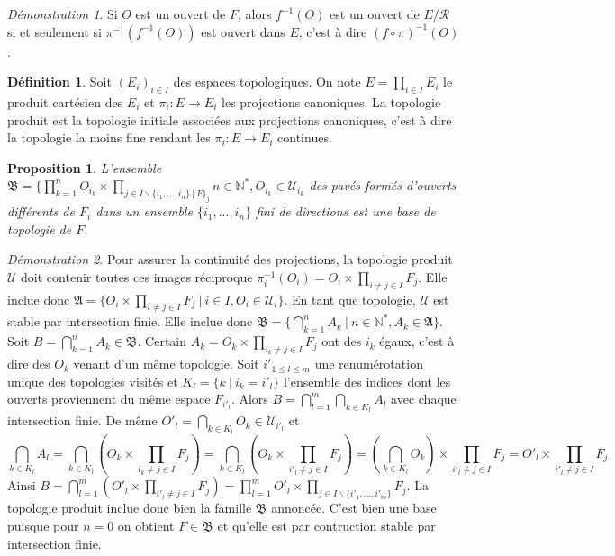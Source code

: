 \documentclass[a4paper, 11pt, french]{book}
\theoremstyle{plain} %
\newtheorem{proposition}{Proposition}
\theoremstyle{definition} %
\newtheorem{definition}{Définition}
\theoremstyle{remark} %
\newtheorem*{demonstration}{Démonstration}
\renewcommand{\setminus}{\backslash}
\newcommand{\1}{\mathds{1}}
\newcommand{\inv}[1]{#1^{-1}}
\newcommand{\N}{\mathbb{N}}
\renewcommand{\frak}[1]{\mathfrak{#1}}
\newcommand{\scr}[1]{\mathscr{#1}}
\newcommand\ens[2]{\{#1 \ |\ #2\}}
\begin{document}
\begin{demonstration}
	Si $O$ est un ouvert de $F$, alors $\inv{f}(O)$ est un ouvert de $E/\mathcal{R}$ si et seulement si $\inv{\pi}(\inv{f}(O))$ est ouvert dans $E$, c'est à dire $\inv{(f\circ\pi)}(O)$.
\end{demonstration}

\begin{definition}
	Soit $(E_i)_{i\in I}$ des espaces topologiques.
	On note $E=\prod_{i\in I} E_i$ le produit cartésien des $E_i$ et $\pi_i\colon E\rightarrow E_i$ les projections canoniques.
	La topologie produit est la topologie initiale associées aux projections canoniques, c'est à dire la topologie la moins fine rendant les $\pi_i\colon E\rightarrow E_i$ continues.
\end{definition}

\begin{proposition}
	L'ensemble $\frak{B}=\{\prod_{k=1}^nO_{i_k}\times\prod_{j\in I\setminus\ens{i_1, ..., i_n\}}F_j}{n\in\N^*, O_{i_k}\in\scr{U}_{i_k}}$ des pavés formés d'ouverts différents de $F_i$ dans un ensemble $\{i_1,...,i_n\}$ fini de directions est une base de topologie de $F$.
\end{proposition}

\begin{demonstration}
	Pour assurer la continuité des projections, la topologie produit $\scr{U}$ doit contenir toutes ces images réciproque $\inv{\pi_i}(O_i)=O_i\times\prod_{i\neq j\in I}F_j$.
	Elle inclue donc $\frak{A}=\ens{O_i\times\prod_{i\neq j\in I}F_j}{i\in I, O_i\in\scr{U}_i}$.
	En tant que topologie, $\scr{U}$ est stable par intersection finie.
	Elle inclue donc $\frak{B}=\ens{\bigcap_{k=1}^nA_k}{n\in\N^*, A_k\in\frak{A}}$.
	Soit $B=\bigcap_{k=1}^nA_k\in\frak{B}$.
	Certain $A_k=O_k\times\prod_{i_k\neq j\in I}F_j$ ont des $i_k$ égaux, c'est à dire des $O_k$ venant d'un même topologie.
	Soit $i'_{1\leqslant l\leqslant m}$ une renumérotation unique des topologies visités et $K_l=\ens{k}{i_k=i'_l}$ l'ensemble des indices dont les ouverts proviennent du même espace $F_{i'_l}$.
	Alors $B=\bigcap_{l=1}^m\bigcap_{k\in K_l}A_l$ avec chaque intersection finie.
	De même $O'_l=\bigcap_{k\in K_l}O_k\in\scr{U}_{i'_l}$ et
	$$
		\bigcap_{k\in K_l}A_l
		=\bigcap_{k\in K_l}(O_k\times\prod_{i_k\neq j\in I}F_j)
		=\bigcap_{k\in K_l}(O_k\times\prod_{i'_l\neq j\in I}F_j)
		=(\bigcap_{k\in K_l}O_k)\times\prod_{i'_l\neq j\in I}F_j
		=O'_l\times\prod_{i'_l\neq j\in I}F_j
	$$
	Ainsi $B=\bigcap_{l=1}^m(O'_l\times\prod_{i'_l\neq j\in I}F_j)=\prod_{l=1}^mO'_l\times\prod_{j\in I\setminus\{i'_1,...,i'_m\}}F_j$.
	La topologie produit inclue donc bien la famille $\frak{B}$ annoncée.
	C'est bien une base puisque pour $n=0$ on obtient $F\in\frak{B}$ et qu'elle est par contruction stable par intersection finie.
\end{demonstration}
\end{document}
